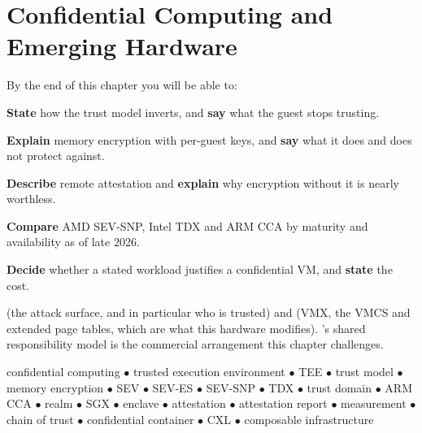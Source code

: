 \chapter{Confidential Computing and Emerging Hardware}\label{ch:confidential}

\begin{outcomes}
By the end of this chapter you will be able to:
\begin{tight}
  \item \textbf{State} how the trust model inverts, and \textbf{say} what the
        guest stops trusting.
  \item \textbf{Explain} memory encryption with per-guest keys, and
        \textbf{say} what it does and does not protect against.
  \item \textbf{Describe} remote attestation and \textbf{explain} why
        encryption without it is nearly worthless.
  \item \textbf{Compare} AMD SEV-SNP, Intel TDX and ARM CCA by maturity and
        availability as of late 2026.
  \item \textbf{Decide} whether a stated workload justifies a confidential VM,
        and \textbf{state} the cost.
\end{tight}
\end{outcomes}

\begin{prereq}
 (the attack surface, and in particular who is trusted) and
 (VMX, the VMCS and extended page tables, which are what this
hardware modifies). 's shared responsibility model is the
commercial arrangement this chapter challenges.
\end{prereq}

\begin{keyterms}
confidential computing $\bullet$ trusted execution environment $\bullet$ TEE
$\bullet$ trust model $\bullet$ memory encryption $\bullet$ SEV $\bullet$
SEV-ES $\bullet$ SEV-SNP $\bullet$ TDX $\bullet$ trust domain $\bullet$ ARM CCA
$\bullet$ realm $\bullet$ SGX $\bullet$ enclave $\bullet$ attestation $\bullet$
attestation report $\bullet$ measurement $\bullet$ chain of trust $\bullet$
confidential container $\bullet$ CXL $\bullet$ composable infrastructure
\end{keyterms}


